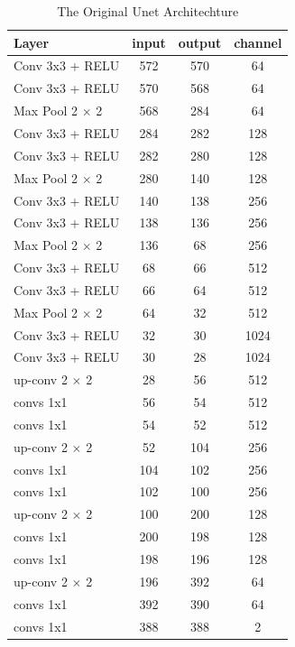 \begin{table}
\centering
	\begin{tabular}{l c c c}
	\hline
	\hline
	Layer	&	input	&	output	&	channel	\\
	\hline
	Conv 3x3 + RELU	&	572	&	570	&	64	\\
	Conv 3x3 + RELU	&	570	&	568	&	64	\\
	Max Pool 2 $\times$ 2	&	568	&	284	&	64	\\
	Conv 3x3 + RELU	&	284	&	282	&	128	\\
	Conv 3x3 + RELU	&	282	&	280	&	128	\\
	Max Pool 2 $\times$ 2	&	280	&	140	&	128	\\
	Conv 3x3 + RELU	&	140	&	138	&	256	\\
	Conv 3x3 + RELU	&	138	&	136	&	256	\\
	Max Pool 2 $\times$ 2	&	136	&	68	&	256	\\
	Conv 3x3 + RELU	&	68	&	66	&	512	\\
	Conv 3x3 + RELU	&	66	&	64	&	512	\\
	Max Pool 2 $\times$ 2	&	64	&	32	&	512	\\
	Conv 3x3 + RELU	&	32	&	30	&	1024	\\
	Conv 3x3 + RELU	&	30	&	28	&	1024	\\
	up-conv 2 $\times$ 2	&	28	&	56	&	512	\\
	convs 1x1	&	56	&	54	&	512	\\
	convs 1x1	&	54	&	52	&	512	\\
	up-conv 2 $\times$ 2	&	52	&	104	&	256	\\
	convs 1x1	&	104	&	102	&	256	\\
	convs 1x1	&	102	&	100	&	256	\\
	up-conv 2 $\times$ 2	&	100	&	200	&	128	\\
	convs 1x1	&	200	&	198	&	128	\\
	convs 1x1	&	198	&	196	&	128	\\
	up-conv 2 $\times$ 2	&	196	&	392	&	64	\\
	convs 1x1	&	392	&	390	&	64	\\
	convs 1x1	&	388	&	388	&	2	\\
	\hline
	\hline
	\end{tabular}
	\caption{The Original Unet Architechture}
	\label{tab:OriginalUnet}
\end{table}

